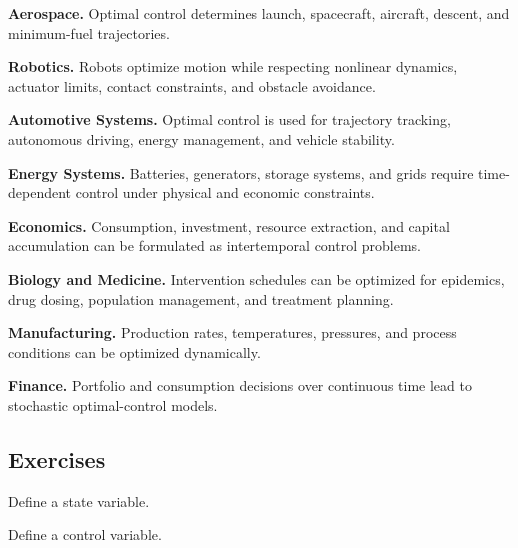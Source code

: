 \begin{applicationbox}

\textbf{Aerospace.}
Optimal control determines launch, spacecraft, aircraft, descent, and
minimum-fuel trajectories.

\medskip

\textbf{Robotics.}
Robots optimize motion while respecting nonlinear dynamics, actuator
limits, contact constraints, and obstacle avoidance.

\medskip

\textbf{Automotive Systems.}
Optimal control is used for trajectory tracking, autonomous driving,
energy management, and vehicle stability.

\medskip

\textbf{Energy Systems.}
Batteries, generators, storage systems, and grids require time-dependent
control under physical and economic constraints.

\medskip

\textbf{Economics.}
Consumption, investment, resource extraction, and capital accumulation can
be formulated as intertemporal control problems.

\medskip

\textbf{Biology and Medicine.}
Intervention schedules can be optimized for epidemics, drug dosing,
population management, and treatment planning.

\medskip

\textbf{Manufacturing.}
Production rates, temperatures, pressures, and process conditions can be
optimized dynamically.

\medskip

\textbf{Finance.}
Portfolio and consumption decisions over continuous time lead to
stochastic optimal-control models.

\end{applicationbox}

\subsection{Exercises}
\label{subsec:optimal-control-exercises}

\begin{exercise}[1]
Define a state variable.
\end{exercise}

\begin{exercise}[1]
Define a control variable.
\end{exercise}

